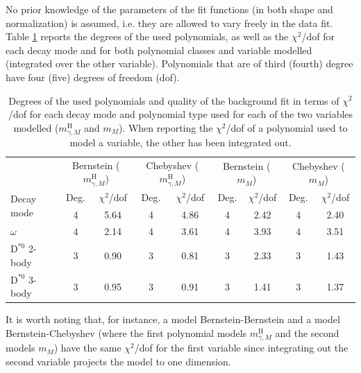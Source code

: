 No prior knowledge of the parameters of the fit functions (in both shape and normalization) is assumed, i.e. they are allowed to vary freely in the data fit. Table \ref{tab:bkg_polynomials} reports the degrees of the used polynomials, as well as the $\chi^2$/dof for each decay mode and for both polynomial classes and variable modelled (integrated over the other variable). Polynomials that are of third (fourth) degree have four (five) degrees of freedom (dof).
\begin{table}[!ht]
    \centering
    \begin{tabular}{|l|cc|cc|cc|cc|}
        \hline
        \cellcolor{lightgray} & \multicolumn{2}{c|}{\cellcolor{lightgray}Bernstein ($m^{\text{H}}_{\gamma, M}$)} & \multicolumn{2}{c|}{\cellcolor{lightgray}Chebyshev ($m^{\text{H}}_{\gamma, M}$)}   & \multicolumn{2}{c|}{\cellcolor{lightgray}Bernstein ($m_{M}$)} & \multicolumn{2}{c|}{\cellcolor{lightgray}Chebyshev ($m_{M}$)} \\
        \multirow{2}{*}[15pt]{\cellcolor{lightgray}Decay mode} & \cellcolor{lightgray}Deg. & \cellcolor{lightgray}$\chi^2$/dof & \cellcolor{lightgray}Deg. & \cellcolor{lightgray}$\chi^2$/dof & \cellcolor{lightgray}Deg. & \cellcolor{lightgray}$\chi^2$/dof & \cellcolor{lightgray}Deg. & \cellcolor{lightgray}$\chi^2$/dof \\ \hline
        $\phi$                  &4&5.64   &4&4.86     &4&2.42   &4&2.40   \\
        $\omega$                &4&2.14   &4&3.61     &4&3.93   &4&3.51   \\
        $\text{D}^{*0}$ 2-body  &3&0.90   &3&0.81     &3&2.33   &3&1.43   \\
        $\text{D}^{*0}$ 3-body  &3&0.95   &3&0.91     &3&1.41   &3&1.37   \\
        \hline
        \end{tabular}
    \caption{Degrees of the used polynomials and quality of the background fit in terms of $\chi^2$/dof for each decay mode and polynomial type used for each of the two variables modelled ($m^{\text{H}}_{\gamma, M}$ and $m_{M}$). When reporting the $\chi^2$/dof of a polynomial used to model a variable, the other has been integrated out.}
    \label{tab:bkg_polynomials}
\end{table}
It is worth noting that, for instance, a model Bernstein-Bernstein and a model Bernstein-Chebyshev (where the first polynomial models $m^{\text{H}}_{\gamma, M}$ and the second models $m_{M}$) have the same $\chi^2$/dof for the first variable since integrating out the second variable projects the model to one dimension.

